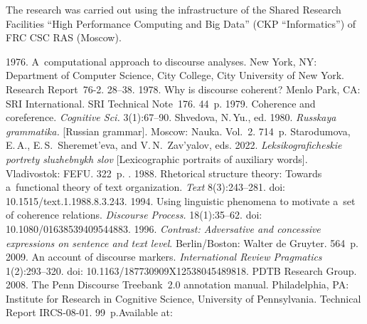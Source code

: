  \Ack
\noindent
The research was carried out using the infrastructure of the Shared Research 
Facilities ``High Performance 
Computing and Big Data'' (CKP ``Informatics'') of FRC CSC RAS (Moscow).


  \begin{multicols}{2}

\renewcommand{\bibname}{\protect\rmfamily References}

{\small\frenchspacing
 {%
 \begin{thebibliography}{99} 
 1976. A~computational approach to discourse analyses. New 
York, NY: Department of Computer Science, City College, City University of New 
York. Research Report~76-2. 28--38.
 1978. Why is discourse coherent? Menlo Park, CA: SRI 
International. SRI Technical Note~176. 44~p.
 1979. Coherence and coreference. \textit{Cognitive Sci.} 
3(1):67--90.
Shvedova, N.\,Yu., ed. 1980. \textit{Rus\-skaya gram\-ma\-ti\-ka.} 
[Russian grammar]. Moscow: Nauka. Vol.~2. 714~p.
Starodumova, E.\,A., E.\,S.~She\-re\-met'\-eva, and V.\,N.~Zav'ya\-lov, eds. 2022.  
\textit{Lek\-si\-ko\-gra\-fi\-che\-skie port\-re\-ty slu\-zheb\-nykh slov} 
[Lexicographic portraits of auxiliary words]. Vladivostok: FEFU. 322~p.
. 1988. Rhetorical structure theory: 
Towards a~functional theory of text organization. \textit{Text} 8(3):243--281. doi: 
10.1515/text.1.1988.8.3.243.
 1994. Using linguistic phenomena to motivate a~set 
of coherence relations. \textit{Discourse Process.} 18(1):35--62. doi: 10.1080/01638539409544883.
 1996. \textit{Contrast: Adversative and concessive expressions on 
sentence and text level}. Berlin/Boston: Walter de Gruyter. 564~p.
 2009. An account of discourse markers. \textit{International Review Pragmatics} 1(2):293--320. doi: 10.1163/187730909X12538045489818.
PDTB Research Group. 2008. The Penn Discourse Treebank~2.0 annotation manual. 
Philadelphia, PA: Institute for Research in Cognitive 
Science, University of Pennsylvania. Technical Report  IRCS-08-01. 99~p.\linebreak Available at: {\sf 
}
\end{thebibliography}}}
\end{multicols}
